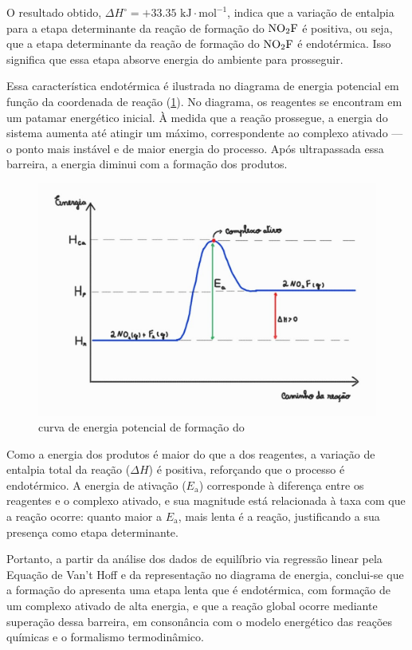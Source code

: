 O resultado obtido, $\Delta H^\circ = +33.35 \text{ kJ} \cdot \text{mol}^{-1}$, indica que a variação de entalpia para a etapa determinante da reação de formação do $\ce{NO2F}$ é positiva, ou seja, que a etapa determinante da reação de formação do $\ce{NO2F}$ é endotérmica. Isso significa que essa etapa absorve energia do ambiente para prosseguir.

Essa característica endotérmica é ilustrada no diagrama de energia potencial em função da coordenada de reação (\cref{diagrama}). No diagrama, os reagentes se encontram em um patamar energético inicial. À medida que a reação prossegue, a energia do sistema aumenta até atingir um máximo, correspondente ao complexo ativado — o ponto mais instável e de maior energia do processo. Após ultrapassada essa barreira, a energia diminui com a formação dos produtos.

    \begin{figure}[H]
        \centering
        \includegraphics[width=0.6\linewidth]{fig/grafico.png}
        \caption{curva de energia potencial de formação do }
        \label{diagrama}
    \end{figure}

Como a energia dos produtos é maior do que a dos reagentes, a variação de entalpia total da reação (\(\Delta H\)) é positiva, reforçando que o processo é endotérmico. A energia de ativação (\(E_\text{a}\)) corresponde à diferença entre os reagentes e o complexo ativado, e sua magnitude está relacionada à taxa com que a reação ocorre: quanto maior a \(E_\text{a}\), mais lenta é a reação, justificando a sua presença como etapa determinante.

Portanto, a partir da análise dos dados de equilíbrio via regressão linear pela Equação de Van't Hoff e da representação no diagrama de energia, conclui-se que a formação do  apresenta uma etapa lenta que é endotérmica, com formação de um complexo ativado de alta energia, e que a reação global ocorre mediante superação dessa barreira, em consonância com o modelo energético das reações químicas e o formalismo termodinâmico.
